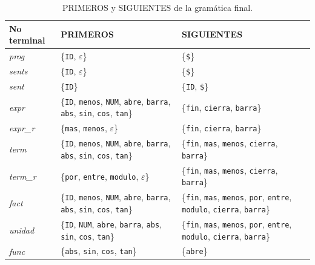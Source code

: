\documentclass[12pt,letterpaper]{article}
\begin{document}
\begin{table}[H]
\centering
\caption{PRIMEROS y SIGUIENTES de la gramática final.}
\footnotesize
\begin{tabular}{l p{5.0cm} p{5.4cm}}
\toprule
No terminal & PRIMEROS & SIGUIENTES \\
\midrule
\textit{prog} & \{\texttt{ID}, $\varepsilon$\} & \{\texttt{\$}\} \\
\textit{sents} & \{\texttt{ID}, $\varepsilon$\} & \{\texttt{\$}\} \\
\textit{sent} & \{\texttt{ID}\} & \{\texttt{ID}, \texttt{\$}\} \\
\textit{expr} & \{\texttt{ID}, \texttt{menos}, \texttt{NUM}, \texttt{abre}, \texttt{barra}, \texttt{abs}, \texttt{sin}, \texttt{cos}, \texttt{tan}\} & \{\texttt{fin}, \texttt{cierra}, \texttt{barra}\} \\
\textit{expr\_r} & \{\texttt{mas}, \texttt{menos}, $\varepsilon$\} & \{\texttt{fin}, \texttt{cierra}, \texttt{barra}\} \\
\textit{term} & \{\texttt{ID}, \texttt{menos}, \texttt{NUM}, \texttt{abre}, \texttt{barra}, \texttt{abs}, \texttt{sin}, \texttt{cos}, \texttt{tan}\} & \{\texttt{fin}, \texttt{mas}, \texttt{menos}, \texttt{cierra}, \texttt{barra}\} \\
\textit{term\_r} & \{\texttt{por}, \texttt{entre}, \texttt{modulo}, $\varepsilon$\} & \{\texttt{fin}, \texttt{mas}, \texttt{menos}, \texttt{cierra}, \texttt{barra}\} \\
\textit{fact} & \{\texttt{ID}, \texttt{menos}, \texttt{NUM}, \texttt{abre}, \texttt{barra}, \texttt{abs}, \texttt{sin}, \texttt{cos}, \texttt{tan}\} & \{\texttt{fin}, \texttt{mas}, \texttt{menos}, \texttt{por}, \texttt{entre}, \texttt{modulo}, \texttt{cierra}, \texttt{barra}\} \\
\textit{unidad} & \{\texttt{ID}, \texttt{NUM}, \texttt{abre}, \texttt{barra}, \texttt{abs}, \texttt{sin}, \texttt{cos}, \texttt{tan}\} & \{\texttt{fin}, \texttt{mas}, \texttt{menos}, \texttt{por}, \texttt{entre}, \texttt{modulo}, \texttt{cierra}, \texttt{barra}\} \\
\textit{func} & \{\texttt{abs}, \texttt{sin}, \texttt{cos}, \texttt{tan}\} & \{\texttt{abre}\} \\
\bottomrule
\end{tabular}
\end{table}
\end{document}
